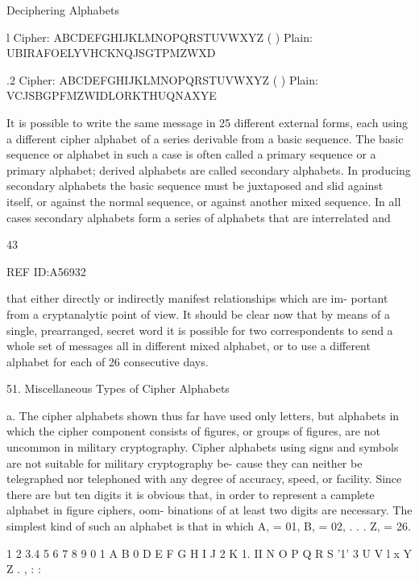 {{Deciphering Alphabets

l Cipher: ABCDEFGHIJKLMNOPQRSTUVWXYZ
( ) Plain: UBIRAFOELYVHCKNQJSGTPMZWXD

.2 Cipher: ABCDEFGHIJKLMNOPQRSTUVWXYZ
( ) Plain: VCJSBGPFMZWIDLORKTHUQNAXYE

It is possible to write the same message in 25 different external forms,
each using a different cipher alphabet of a series derivable from a
basic sequence. The basic sequence or alphabet in such a case is often
called a primary sequence or a primary alphabet; derived alphabets
are called secondary alphabets. In producing secondary alphabets the
basic sequence must be juxtaposed and slid against itself, or against
the normal sequence, or against another mixed sequence. In all cases
secondary alphabets form a series of alphabets that are interrelated and

43

 

REF ID:A56932

that either directly or indirectly manifest relationships which are im-
portant from a cryptanalytic point of view. It should be clear now that
by means of a single, prearranged, secret word it is possible for two
correspondents to send a whole set of messages all in different mixed
alphabet, or to use a different alphabet for each of 26 consecutive days.

51. Miscellaneous Types of Cipher Alphabets

a. The cipher alphabets shown thus far have used only letters, but
alphabets in which the cipher component consists of ﬁgures, or groups
of ﬁgures, are not uncommon in military cryptography. Cipher alphabets
using signs and symbols are not suitable for military cryptography be-
cause they can neither be telegraphed nor telephoned with any degree
of accuracy, speed, or facility. Since there are but ten digits it is obvious
that, in order to represent a camplete alphabet in ﬁgure ciphers, oom-
binations of at least two digits are necessary. The simplest kind of such
an alphabet is that in which A, = 01, B, = 02, . . . Z, = 26.

 

 

 

1 2 3.4 5 6 7 8 9 0
1 A B 0 D E F G H I J
2 K 1. II N O P Q R S '1'
3 U V l x Y Z . , : :

 

 

 

 

}}
